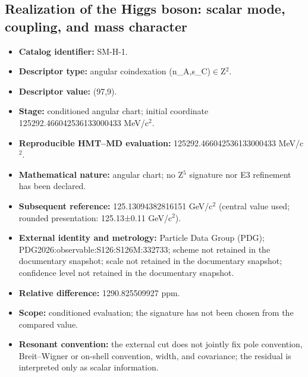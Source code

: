 \subsection{Realization of the Higgs boson: scalar mode, coupling, and mass character}
\begin{itemize}
\item \textbf{Catalog identifier:} SM-H-1.
\item \textbf{Descriptor type:} angular coindexation (n\_A,s\_C)\(\in\)Z\({}^{2}\).
\item \textbf{Descriptor value:} (97,9).
\item \textbf{Stage:} conditioned angular chart; initial coordinate 125292.466042\allowbreak{}536133\allowbreak{}000433 MeV/c\({}^{2}\).
\item \textbf{Reproducible HMT--MD evaluation:} 125292.466042\allowbreak{}536133\allowbreak{}000433 MeV/c\({}^{2}\).
\item \textbf{Mathematical nature:} angular chart; no Z\({}^{5}\) signature nor E3 refinement has been declared.
\item \textbf{Subsequent reference:} 125.130943\allowbreak{}828161\allowbreak{}51 GeV/c\({}^{2}\) (central value used; rounded presentation: 125.13±\allowbreak{}0.11 GeV/c\({}^{2}\)).
\item \textbf{External identity and metrology:} Particle Data Group (PDG); PDG2026:\allowbreak{}observable:\allowbreak{}S126:\allowbreak{}S126M:\allowbreak{}332733; scheme not retained in the documentary snapshot; scale not retained in the documentary snapshot; confidence level not retained in the documentary snapshot.
\item \textbf{Relative difference:} 1290.825509\allowbreak{}927 ppm.
\item \textbf{Scope:} conditioned evaluation; the signature has not been chosen from the compared value.
\item \textbf{Resonant convention:} the external cut does not jointly fix pole convention, Breit--Wigner or on-shell convention, width, and covariance; the residual is interpreted only as scalar information.
\end{itemize}
